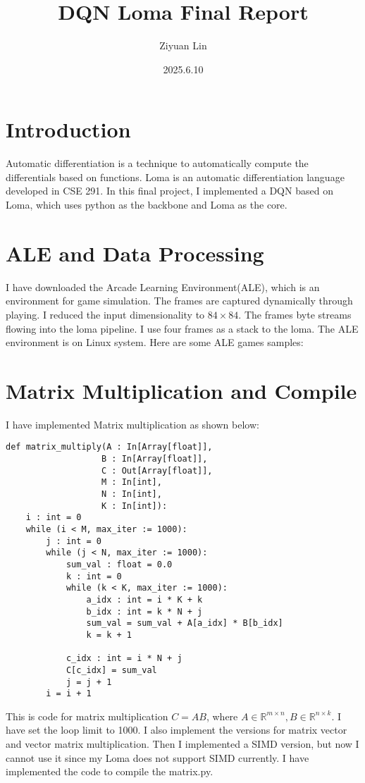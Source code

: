 \documentclass{article}
\title{DQN Loma Final Report}
\author{Ziyuan Lin}
\date{2025.6.10}
\begin{document}
\maketitle
\section{Introduction}
Automatic differentiation is a technique to automatically compute the differentials based on functions. Loma is an automatic differentiation language developed in CSE 291. 
In this final project, I implemented a DQN based on Loma, which uses python as the backbone and Loma as the core. 
\section{ALE and Data Processing}
I have downloaded the Arcade Learning Environment(ALE), which is an environment for game simulation. The frames are captured dynamically through playing.
I reduced the input dimensionality to $84 \times 84$. The frames byte streams flowing into the loma pipeline. I use four frames as a stack to the loma.
The ALE environment is on Linux system. Here are some ALE games samples: 

\section{Matrix Multiplication and Compile}
I have implemented Matrix multiplication as shown below:
\begin{lstlisting}
def matrix_multiply(A : In[Array[float]], 
                   B : In[Array[float]], 
                   C : Out[Array[float]], 
                   M : In[int], 
                   N : In[int], 
                   K : In[int]):
    i : int = 0
    while (i < M, max_iter := 1000):
        j : int = 0
        while (j < N, max_iter := 1000):
            sum_val : float = 0.0
            k : int = 0
            while (k < K, max_iter := 1000):
                a_idx : int = i * K + k
                b_idx : int = k * N + j
                sum_val = sum_val + A[a_idx] * B[b_idx]
                k = k + 1
            
            c_idx : int = i * N + j
            C[c_idx] = sum_val
            j = j + 1
        i = i + 1
\end{lstlisting}
This is code for matrix multiplication $C = AB$, where $A \in \mathbb{R}^{m \times n}, B \in \mathbb{R}^{n \times k}$. I have set the loop limit to 1000.
I also implement the versions for matrix vector and vector matrix multiplication. Then I implemented a SIMD version, but now I cannot use it since my Loma
does not support SIMD currently. I have implemented the code to compile the matrix.py.
\end{document}
